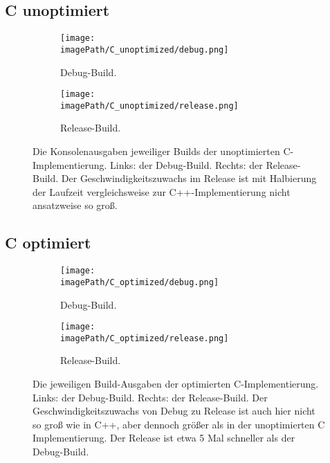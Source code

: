 \subsection{C unoptimiert}
\begin{figure}[H]
	\centering
	\begin{subfigure}{.5\textwidth}
		\centering
		\texttt{[image: \\imagePath/C\_unoptimized/debug.png]}
		\caption{Debug-Build.}
		\label{fig:c_unoptimized_debug}
	\end{subfigure}%
	\begin{subfigure}{.5\textwidth}
		\centering
		\texttt{[image: \\imagePath/C\_unoptimized/release.png]}
		\caption{Release-Build.}
		\label{fig:c_unoptimized_release}
	\end{subfigure}
	\caption{Die Konsolenausgaben jeweiliger Builds der unoptimierten C-Implementierung. Links: der Debug-Build. Rechts: der Release-Build. Der Geschwindigkeitszuwachs im Release ist mit Halbierung der Laufzeit  vergleichsweise zur C++-Implementierung nicht ansatzweise so groß.}
	\label{fig:c_unoptimized}
\end{figure}

\subsection{C optimiert}
\begin{figure}[H]
	\centering
	\begin{subfigure}{.5\textwidth}
		\centering
		\texttt{[image: \\imagePath/C\_optimized/debug.png]}
		\caption{Debug-Build.}
		\label{fig:c_optimized_debug}
	\end{subfigure}%
	\begin{subfigure}{.5\textwidth}
		\centering
		\texttt{[image: \\imagePath/C\_optimized/release.png]}
		\caption{Release-Build.}
		\label{fig:c_optimized_release}
	\end{subfigure}
	\caption{Die jeweiligen Build-Ausgaben der optimierten C-Implementierung. Links: der Debug-Build. Rechts: der Release-Build. Der Geschwindigkeitszuwachs von Debug zu Release ist auch hier nicht so groß wie in C++, aber dennoch größer als in der unoptimierten C Implementierung. Der Release ist etwa 5 Mal schneller als der Debug-Build.}
	\label{fig:c_optimized}
\end{figure}

